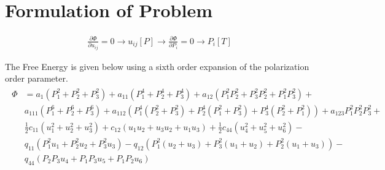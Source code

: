 \documentclass{article}
\begin{document}
\linespread{1.1}




\section{Formulation of Problem}
\begin{align}
\frac{\partial \Phi}{\partial u_{ij}}=0 \to u_{ij}[P]\to \frac{\partial \Phi}{\partial P_i}=0 \to P_i[T]
\end{align}

The Free Energy is given below using a sixth order expansion of the polarization order parameter. \\
\begin{align}
\begin{split}\Phi &=a_1 \left(P_1^2+P_2^2+P_3^2\right)+a_{11} \left(P_1^4+P_2^4+P_3^4\right)+a_{12} \left(P_1^2 P_2^2+P_3^2 P_2^2+P_1^2 P_3^2\right)+ \\ 
&a_{111} \left(P_1^6+P_2^6+P_3^6\right)+a_{112} \left( P_1^4\left(P_2^2+P_3^2\right)+P_2^4\left(P_1^2+P_3^2\right)+P_3^4 \left(P_2^2+P_1^2\right)\right)+a_{123} P_1^2 P_2^2 P_3^2+ \\ 
&\frac{1}{2} c_{11} \left(u_1^2+u_2^2+u_3^2\right)+ c_{12} \left(u_1 u_2+u_3 u_2+u_1 u_3\right)+\frac{1}{2} c_{44} \left(u_4^2+u_5^2+u_6^2\right)- \\ 
& q_{11} \left(P_1^2 u_1+P_2^2 u_2+P_3^2 u_3\right)-q_{12} \left(P_1^2 \left(u_2+u_3\right)+P_3^2 \left(u_1+u_2\right)+P_2^2 \left(u_1+u_3\right)\right)- \\ & q_{44} \left(P_2 P_3 u_4+P_1 P_3 u_5+P_1 P_2 u_6\right) \end{split}
\end{align}
\end{document}
